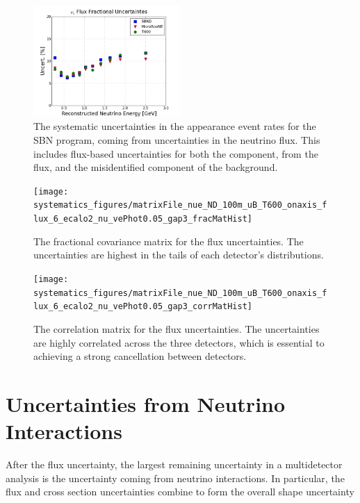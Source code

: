 \begin{figure}[]
    \centering
    \includegraphics[width=0.5\textwidth]{systematics_figures/matrixFile_nue_ND_100m_uB_T600_onaxis_flux_6_ecalo2_nu_vePhot0.05_gap3_fracUncert}
    \caption[Fractional Flux Uncertainties]{The systematic uncertainties in the \nue appearance event rates for the SBN program, coming from uncertainties in the neutrino flux.  This includes flux-based uncertainties for both the \nue component, from the \nue flux, and the \numu misidentified component of the background.}
   \label{fig:sys_flux_uncert_fracUncert}
\end{figure}

\begin{figure}[]
    \centering
    \texttt{[image: systematics\_figures/matrixFile\_nue\_ND\_100m\_uB\_T600\_onaxis\_flux\_6\_ecalo2\_nu\_vePhot0.05\_gap3\_fracMatHist]}
    \caption[Flux Fractional Covariance Matrix]{The fractional covariance matrix for the flux uncertainties.  The uncertainties are highest in the tails of each detector's distributions.}
   \label{fig:syst_flux_fracmatrix}
\end{figure}
\begin{figure}[]
    \centering
    \texttt{[image: systematics\_figures/matrixFile\_nue\_ND\_100m\_uB\_T600\_onaxis\_flux\_6\_ecalo2\_nu\_vePhot0.05\_gap3\_corrMatHist]}
    \caption[Flux Correlation Matrix]{The correlation matrix for the flux uncertainties. The uncertainties are highly correlated across the three detectors, which is essential to achieving a strong cancellation between detectors. }
   \label{fig:syst_flux_corrmatrix}
\end{figure}



\section{Uncertainties from Neutrino Interactions}

After the flux uncertainty, the largest remaining uncertainty in a multidetector analysis is the uncertainty coming from neutrino interactions.  In particular, the flux and cross section uncertainties combine to form the overall shape uncertainty 

